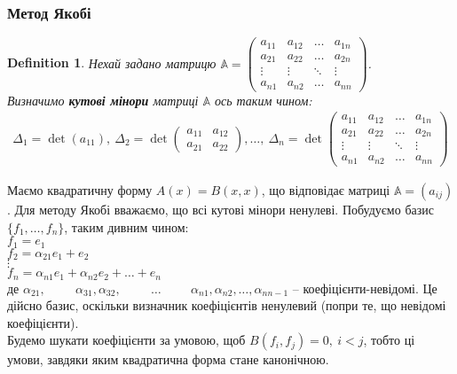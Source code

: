 \documentclass[a4paper, 10pt]{article}
\theoremstyle{theoremdd}
\newtheorem{definition}[theorem]{Definition}
\begin{document}
\subsubsection{Метод Якобі}
\begin{definition}
Нехай задано матрицю $\mathbb{A} = \begin{pmatrix}
a_{11} & a_{12} & \dots & a_{1n} \\
a_{21} & a_{22} & \dots & a_{2n} \\
\vdots & \vdots & \ddots & \vdots \\
a_{n1} & a_{n2} & \dots & a_{nn} 
\end{pmatrix}$.\\
Визначимо \textbf{кутові мінори} матриці $\mathbb{A}$ ось таким чином:
\begin{align*}
\Delta_1 = \det (a_{11}),\ \Delta_2 = \det \begin{pmatrix}
a_{11} & a_{12} \\
a_{21} & a_{22}
\end{pmatrix}, \dots,\ \Delta_n = \det \begin{pmatrix}
a_{11} & a_{12} & \dots & a_{1n} \\
a_{21} & a_{22} & \dots & a_{2n} \\
\vdots & \vdots & \ddots & \vdots \\
a_{n1} & a_{n2} & \dots & a_{nn} 
\end{pmatrix}
\end{align*}
\end{definition}
\noindent
Маємо квадратичну форму $A(x) = B(x,x)$, що відповідає матриці $\mathbb{A} = (a_{ij})$. Для методу Якобі вважаємо, що всі кутові мінори ненулеві. Побудуємо базис $\{f_1,\dots,f_n\}$, таким дивним чином:\\
$f_1 = e_1$\\
$f_2 = \alpha_{21}e_1 + e_2$\\
$\vdots$\\
$f_n = \alpha_{n1}e_1 + \alpha_{n2}e_2 + \dots + e_n$\\
де $\alpha_{21}, \hspace{1cm} \alpha_{31}, \alpha_{32}, \hspace{1cm} \dots \hspace{1cm} \alpha_{n1}, \alpha_{n2}, \dots, \alpha_{nn-1}$ -- коефіцієнти-невідомі.
Це дійсно базис, оскільки визначник коефіцієнтів ненулевий (попри те, що невідомі коефіцієнти).\\
Будемо шукати коефіцієнти за умовою, щоб $B(f_i,f_j) = 0,\ i < j$, тобто ці умови, завдяки яким квадратична форма стане канонічною.\\
\end{document}
